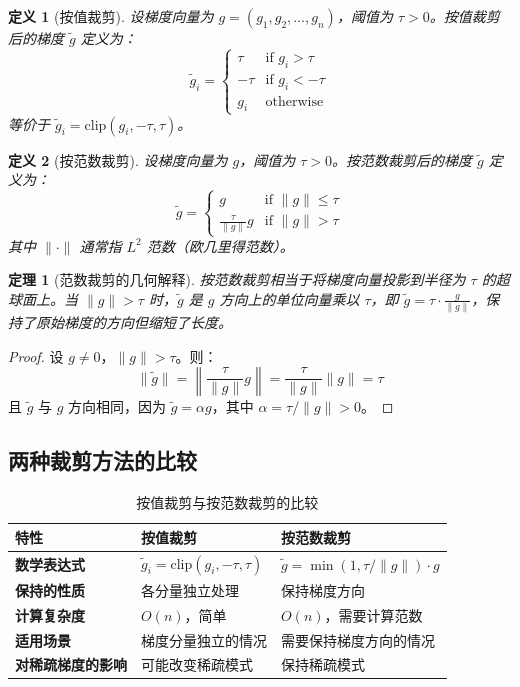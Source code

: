 \documentclass{article}
\newtheorem{definition}{定义}[section]
\newtheorem{theorem}{定理}[section]
\begin{document}
\begin{definition}[按值裁剪]
设梯度向量为 $g = (g_1, g_2, \dots, g_n)$，阈值为 $\tau > 0$。按值裁剪后的梯度 $\tilde{g}$ 定义为：
\[
\tilde{g}_i =
\begin{cases}
\tau & \text{if } g_i > \tau \\
-\tau & \text{if } g_i < -\tau \\
g_i & \text{otherwise}
\end{cases}
\]
等价于 $\tilde{g}_i = \text{clip}(g_i, -\tau, \tau)$。
\end{definition}

\begin{definition}[按范数裁剪]
设梯度向量为 $g$，阈值为 $\tau > 0$。按范数裁剪后的梯度 $\tilde{g}$ 定义为：
\[
\tilde{g} =
\begin{cases}
g & \text{if } \|g\| \leq \tau \\
\frac{\tau}{\|g\|} g & \text{if } \|g\| > \tau
\end{cases}
\]
其中 $\| \cdot \|$ 通常指 $L^2$ 范数（欧几里得范数）。
\end{definition}

\begin{theorem}[范数裁剪的几何解释]
按范数裁剪相当于将梯度向量投影到半径为 $\tau$ 的超球面上。当 $\|g\| > \tau$ 时，$\tilde{g}$ 是 $g$ 方向上的单位向量乘以 $\tau$，即 $\tilde{g} = \tau \cdot \frac{g}{\|g\|}$，保持了原始梯度的方向但缩短了长度。
\end{theorem}

\begin{proof}
设 $g \neq 0$，$\|g\| > \tau$。则：
\[
\|\tilde{g}\| = \left\| \frac{\tau}{\|g\|} g \right\| = \frac{\tau}{\|g\|} \|g\| = \tau
\]
且 $\tilde{g}$ 与 $g$ 方向相同，因为 $\tilde{g} = \alpha g$，其中 $\alpha = \tau/\|g\| > 0$。
\end{proof}

\subsection{两种裁剪方法的比较}

\begin{table}[h]
\centering
\caption{按值裁剪与按范数裁剪的比较}
\begin{tabular}{|p{}|p{}|p{}|}
\hline
\textbf{特性} & \textbf{按值裁剪} & \textbf{按范数裁剪} \\
\hline
\textbf{数学表达式} & $\tilde{g}_i = \text{clip}(g_i, -\tau, \tau)$ & $\tilde{g} = \min(1, \tau/\|g\|) \cdot g$ \\
\hline
\textbf{保持的性质} & 各分量独立处理 & 保持梯度方向 \\
\hline
\textbf{计算复杂度} & $O(n)$，简单 & $O(n)$，需要计算范数 \\
\hline
\textbf{适用场景} & 梯度分量独立的情况 & 需要保持梯度方向的情况 \\
\hline
\textbf{对稀疏梯度的影响} & 可能改变稀疏模式 & 保持稀疏模式 \\
\hline
\end{tabular}
\end{table}
\end{document}
